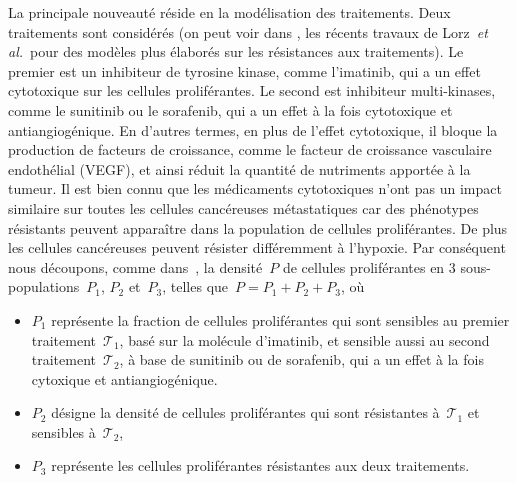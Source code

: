 \documentclass[11pt]{amsart}
\numberwithin{equation}{section}
\newcommand{\etal}{{\it et al.}}
\newcommand{\TI}{{\mathcal T_1}}
\newcommand{\TS}{{\mathcal T_2}}
\begin{document}
La principale nouveauté réside en la modélisation des traitements. Deux traitements sont considérés (on peut voir dans \cite{lorz2013}, les récents travaux de Lorz~\etal\ pour des modèles plus élaborés sur les résistances aux traitements). 
Le premier est un inhibiteur de tyrosine kinase, comme l'imatinib, qui a un effet cytotoxique 
sur les cellules proliférantes. Le second est inhibiteur multi-kinases, comme le sunitinib ou le sorafenib, qui a un effet à la fois cytotoxique et antiangiogénique. En d'autres termes, en plus de l'effet cytotoxique, il bloque la production de facteurs de croissance, comme le facteur de croissance vasculaire endothélial (VEGF), et ainsi réduit la quantité de nutriments apportée à la tumeur. 
Il est bien connu que les médicaments cytotoxiques n'ont pas un impact similaire sur toutes les cellules cancéreuses métastatiques car des phénotypes résistants peuvent apparaître dans la population de cellules proliférantes. De plus les cellules cancéreuses peuvent résister différemment à l'hypoxie. Par conséquent nous découpons, comme dans~\cite{Bresch2009}, la densité~$P$ de cellules proliférantes en 3 sous-populations~$P_1$, $P_2$ et~$P_3$, telles  que~$P=P_1+P_2+P_3$, où
\begin{itemize}
\item $P_1$ représente la fraction de cellules proliférantes qui sont sensibles au premier traitement~$\TI$, basé sur la molécule d'imatinib, et sensible aussi au second traitement~$\TS$, à base de sunitinib ou de sorafenib, qui a un effet à la fois cytoxique et antiangiogénique. 
\item $P_2$ désigne la densité de cellules proliférantes qui sont résistantes à~$\TI$ et sensibles à~$\TS$,
\item $P_3$ représente les cellules proliférantes résistantes aux deux traitements. 
\end{itemize}
\end{document}

